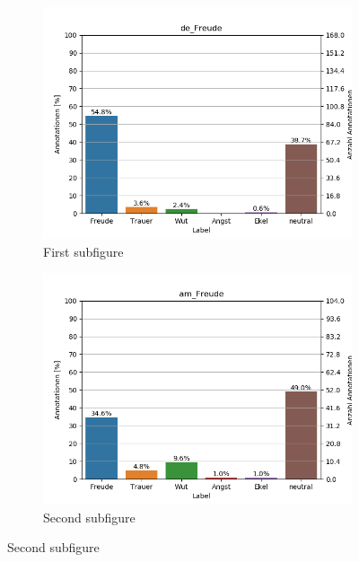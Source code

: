 \documentclass[11pt,a4paper,headsepline,twoside,toc=bibliography]{scrreprt}
\begin{document}
\begin{figure}[t!] %
	\begin{subfigure}{0.48\textwidth}
		\includegraphics[width=\linewidth]{plots/de_Freude.png}
		\caption{First subfigure} \label{fig:de_F}
	\end{subfigure}\hspace*{\fill}
	\begin{subfigure}{0.48\textwidth}
		\includegraphics[width=\linewidth]{plots/am_Freude.png}
		\caption{Second subfigure} \label{fig:am_F}
	\end{subfigure}
	

\end{figure}
\end{document}
